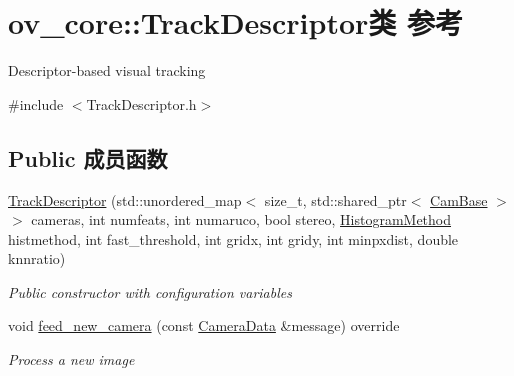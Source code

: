 \hypertarget{classov__core_1_1TrackDescriptor}{}\section{ov\+\_\+core\+:\+:Track\+Descriptor类 参考}
\label{classov__core_1_1TrackDescriptor}


Descriptor-\/based visual tracking  




{\ttfamily \#include $<$Track\+Descriptor.\+h$>$}

\subsection*{Public 成员函数}
\begin{DoxyCompactItemize}
\item 
\hyperlink{classov__core_1_1TrackDescriptor_a5f7793abdb80621d2d41e619cd46b9cf}{Track\+Descriptor} (std\+::unordered\+\_\+map$<$ size\+\_\+t, std\+::shared\+\_\+ptr$<$ \hyperlink{classov__core_1_1CamBase}{Cam\+Base} $>$$>$ cameras, int numfeats, int numaruco, bool stereo, \hyperlink{classov__core_1_1TrackBase_aa4b34a5dce99b59522d57bf9278c9a1a}{Histogram\+Method} histmethod, int fast\+\_\+threshold, int gridx, int gridy, int minpxdist, double knnratio)
\begin{DoxyCompactList}\small\item\em Public constructor with configuration variables \end{DoxyCompactList}\item 
void \hyperlink{classov__core_1_1TrackDescriptor_afcbf3078992f740582eac24e3164e6f1}{feed\+\_\+new\+\_\+camera} (const \hyperlink{structov__core_1_1CameraData}{Camera\+Data} \&message) override
\begin{DoxyCompactList}\small\item\em Process a new image \end{DoxyCompactList}\end{DoxyCompactItemize}
